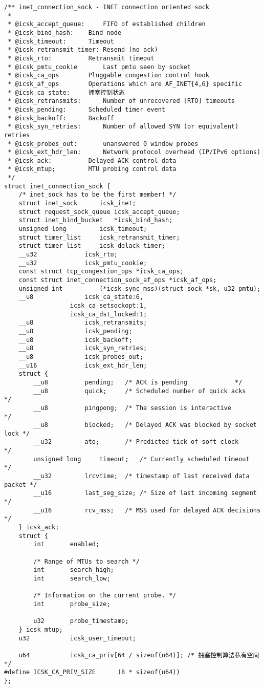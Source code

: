 \begin{verbatim}
/** inet_connection_sock - INET connection oriented sock
 *
 * @icsk_accept_queue:     FIFO of established children 
 * @icsk_bind_hash:    Bind node
 * @icsk_timeout:      Timeout
 * @icsk_retransmit_timer: Resend (no ack)
 * @icsk_rto:          Retransmit timeout
 * @icsk_pmtu_cookie       Last pmtu seen by socket
 * @icsk_ca_ops        Pluggable congestion control hook
 * @icsk_af_ops        Operations which are AF_INET{4,6} specific
 * @icsk_ca_state:     拥塞控制状态
 * @icsk_retransmits:      Number of unrecovered [RTO] timeouts
 * @icsk_pending:      Scheduled timer event
 * @icsk_backoff:      Backoff
 * @icsk_syn_retries:      Number of allowed SYN (or equivalent) retries
 * @icsk_probes_out:       unanswered 0 window probes
 * @icsk_ext_hdr_len:      Network protocol overhead (IP/IPv6 options)
 * @icsk_ack:          Delayed ACK control data
 * @icsk_mtup;         MTU probing control data
 */
struct inet_connection_sock {
    /* inet_sock has to be the first member! */
    struct inet_sock      icsk_inet;
    struct request_sock_queue icsk_accept_queue;
    struct inet_bind_bucket   *icsk_bind_hash;
    unsigned long         icsk_timeout;
    struct timer_list     icsk_retransmit_timer;
    struct timer_list     icsk_delack_timer;
    __u32             icsk_rto;
    __u32             icsk_pmtu_cookie;
    const struct tcp_congestion_ops *icsk_ca_ops;
    const struct inet_connection_sock_af_ops *icsk_af_ops;
    unsigned int          (*icsk_sync_mss)(struct sock *sk, u32 pmtu);
    __u8              icsk_ca_state:6,
                  icsk_ca_setsockopt:1,
                  icsk_ca_dst_locked:1;
    __u8              icsk_retransmits;
    __u8              icsk_pending;
    __u8              icsk_backoff;
    __u8              icsk_syn_retries;
    __u8              icsk_probes_out;
    __u16             icsk_ext_hdr_len;
    struct {
        __u8          pending;   /* ACK is pending             */
        __u8          quick;     /* Scheduled number of quick acks     */
        __u8          pingpong;  /* The session is interactive         */
        __u8          blocked;   /* Delayed ACK was blocked by socket lock */
        __u32         ato;       /* Predicted tick of soft clock       */
        unsigned long     timeout;   /* Currently scheduled timeout        */
        __u32         lrcvtime;  /* timestamp of last received data packet */
        __u16         last_seg_size; /* Size of last incoming segment      */
        __u16         rcv_mss;   /* MSS used for delayed ACK decisions     */ 
    } icsk_ack;
    struct {
        int       enabled;

        /* Range of MTUs to search */
        int       search_high;
        int       search_low;

        /* Information on the current probe. */
        int       probe_size;

        u32       probe_timestamp;
    } icsk_mtup;
    u32           icsk_user_timeout;

    u64           icsk_ca_priv[64 / sizeof(u64)]; /* 拥塞控制算法私有空间 */
#define ICSK_CA_PRIV_SIZE      (8 * sizeof(u64))
};
\end{verbatim}

